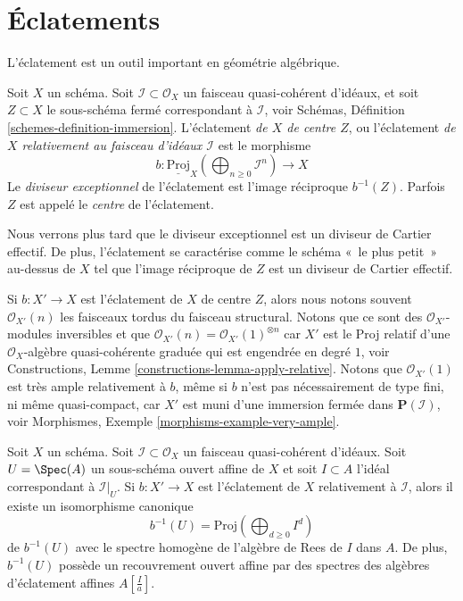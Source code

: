 \section{Éclatements}
\label{section-blowing-up}

\noindent
L'éclatement est un outil important en géométrie algébrique.

\begin{definition}
\label{definition-blow-up}
Soit  $X$  un schéma. Soit  $\mathcal{I} \subset \mathcal{O}_X$  un faisceau quasi-cohérent
d'idéaux, et soit  $Z \subset X$  le sous-schéma fermé correspondant à  $\mathcal{I}$,
voir Schémas, Définition  \ref{schemes-definition-immersion}. L'éclatement  {\it  de
 $X$  de centre  $Z$}, ou l'éclatement
 {\it  de  $X$  relativement au faisceau d'idéaux
 $\mathcal{I}$}  est le morphisme
$$
b :
\underline{\text{Proj}}_X
\left(\bigoplus\nolimits_{n \geq 0} \mathcal{I}^n\right)
\longrightarrow
X
$$
Le  {\it diviseur exceptionnel} de l'éclatement est
l'image réciproque $b^{-1}(Z)$. Parfois  $Z$  est appelé le
 {\it centre}  de l'éclatement.
\end{definition}

\noindent
Nous verrons plus tard que le diviseur exceptionnel est un diviseur de Cartier
effectif. De plus, l'éclatement se caractérise comme le schéma « le plus petit »
au-dessus de $X$ tel que l'image réciproque de $Z$ est un diviseur
de Cartier effectif.

\medskip\noindent
Si  $b : X' \to X$  est l’éclatement de  $X$  de centre  $Z$, alors nous
notons souvent  $\mathcal{O}_{X'}(n)$  les faisceaux tordus du faisceau structural. Notons que ce sont
des  $\mathcal{O}_{X'}$-modules inversibles et que  $\mathcal{O}_{X'}(n) = \mathcal{O}_{X'}(1)^{\otimes n}$  car  $X'$  est le
Proj relatif d’une  $\mathcal{O}_X$-algèbre quasi-cohérente graduée qui est engendrée
en degré  $1$, voir Constructions, Lemme  \ref{constructions-lemma-apply-relative}. Notons que
 $\mathcal{O}_{X'}(1)$  est très ample relativement à  $b$, même si  $b$ 
n’est pas nécessairement de type fini, ni même quasi-compact, car  $X'$  est
muni d’une immersion fermée dans  $\mathbf{P}(\mathcal{I})$, voir Morphismes, Exemple
 \ref{morphisms-example-very-ample}.

\begin{lemma}
\label{lemma-blowing-up-affine}
Soit  $X$  un schéma. Soit  $\mathcal{I} \subset \mathcal{O}_X$  un faisceau quasi-cohérent
d'idéaux. Soit  $U = \Spec(A)$  un sous-schéma ouvert affine de  $X$  et soit
 $I \subset A$  l'idéal correspondant à  $\mathcal{I}|_U$. Si  $b : X' \to X$  est
l'éclatement de  $X$  relativement à  $\mathcal{I}$, alors il existe un isomorphisme
canonique
$$
b^{-1}(U) = \text{Proj}(\bigoplus\nolimits_{d \geq 0} I^d)
$$
de  $b^{-1}(U)$  avec le spectre homogène de l'algèbre de Rees de  $I$  dans
 $A$. De plus,  $b^{-1}(U)$  possède un recouvrement ouvert affine par des
spectres des algèbres d'éclatement affines  $A[\frac{I}{a}]$.
\end{lemma}

